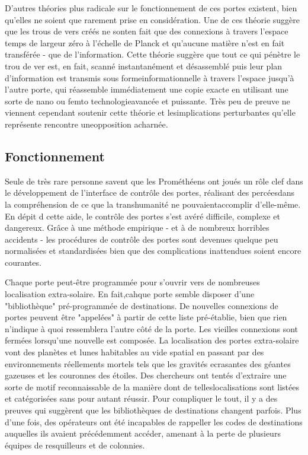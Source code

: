 D'autres théories plus radicale sur le fonctionnement de ces portes existent, bien qu'elles ne soient que rarement prise en considération. Une de ces théorie suggère que les trous de vers créés ne sonten fait que des connexions à travers l'espace temps de largeur zéro à l'échelle de Planck et qu'aucune matière n'est en fait transférée - que de l'information. Cette théorie suggère que tout ce qui pénètre le trou de ver est, en fait, scanné instantanément et désassemblé puis leur plan d'information est transmis sous formeinformationnelle à travers l'espace jusqu'à l'autre porte, qui réassemble immédiatement une copie exacte en utilisant une sorte de nano ou femto technologieavancée et puissante. Très peu de preuve ne viennent cependant soutenir cette théorie et lesimplications perturbantes qu'elle représente rencontre uneopposition acharnée. 

\subsection{Fonctionnement} 

Seule de très rare personne savent que les Prométhéens ont joués un rôle clef dans le développement de l'interface de contrôle des portes, réalisant des percéesdans la compréhension de ce que la transhumanité ne pouvaientaccomplir d'elle-même. En dépit d cette aide, le contrôle des portes s'est avéré difficile, complexe et dangereux. Grâce à une méthode empirique - et à de nombreux horribles accidents - les procédures de contrôle des portes sont devenues quelque peu normalisées et standardisées bien que des complications inattendues soient encore courantes. 

Chaque porte peut-être programmée pour s'ouvrir vers de nombreuses localisation extra-solaire. En fait,cahque porte semble disposer d'une "bibliothèque" pré-programmée de destinations. De nouvelles connexions de portes peuvent être "appelées" à partir de cette liste pré-établie, bien que rien n'indique à quoi ressemblera l'autre côté de la porte. Les vieilles connexions sont fermées lorsqu'une nouvelle est composée. La localisation des portes extra-solaire vont des planètes et lunes habitables au vide spatial en passant par des environnements réellements mortels tels que les gravités ecrasantes des géantes gazeuses et les couronnes des étoiles. Des chercheurs ont tentés d'extraire une sorte de motif reconnaissable de la manière dont de telleslocalisations sont listées et catégorisées sans pour autant réussir. Pour compliquer le tout, il y a des preuves qui suggèrent que les bibliothèques de destinations changent parfois. Plus d'une fois, des opérateurs ont été incapables de rappeller les codes de destinations auquelles ils avaient précédemment accéder, amenant à la perte de plusieurs équipes de resquilleurs et de colonnies. 

